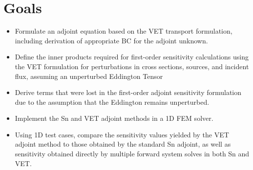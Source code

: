 \documentclass{article}
\begin{document}
\section{Goals}

\begin{itemize}
\item Formulate an adjoint equation based on the VET transport formulation, including derivation of appropriate BC for the adjoint unknown.
\item Define the inner products required for first-order sensitivity calculations using the VET formulation for perturbations in cross sections, sources, and incident flux, assuming an unperturbed Eddington Tensor
\item Derive terms that were lost in the first-order adjoint sensitivity formulation due to the assumption that the Eddington remains unperturbed. 
\item Implement the Sn and VET adjoint methods in a 1D FEM solver. 
\item Using 1D test cases, compare the sensitivity values yielded by the VET adjoint method to those obtained by the standard Sn adjoint, as well as sensitivity obtained directly by multiple forward system solves in both Sn and VET.
\end{itemize}

\newpage


\newpage


 


\end{document}
